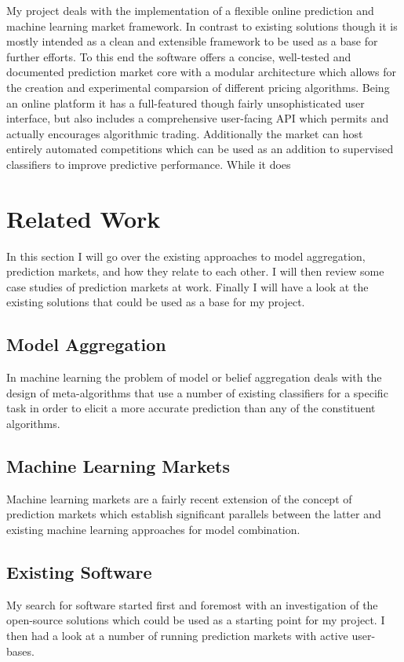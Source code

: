 \documentclass[bsc,frontabs,twoside,singlespacing,parskip,deptreport]{infthesis}     %
\begin{document}
	My project deals with the implementation of a flexible online prediction and machine learning market framework. In contrast to existing solutions  though it is mostly intended as a clean and extensible framework to be used as a base for further efforts. To this end the software offers a concise, well-tested and documented prediction market core with a modular architecture which allows for the creation and experimental comparsion of different pricing algorithms. Being an online platform it has a full-featured though fairly unsophisticated user interface, but also includes a comprehensive user-facing API which permits and actually encourages algorithmic trading. Additionally the market can host entirely automated competitions which can be used as an addition to supervised classifiers to improve predictive performance. 
	While it does 

\chapter{Related Work}

	In this section I will go over the existing approaches to model aggregation, prediction markets, and how they relate to each other. I will then review some case studies of prediction markets at work. Finally I will have a look at the existing solutions that could be used as a base for my project. 

\section{Model Aggregation}
	In machine learning the problem of model or belief aggregation deals with the design of meta-algorithms that use a number of existing classifiers for a specific task in order to elicit a more accurate prediction than any of the constituent algorithms. 

\section{Machine Learning Markets}
    Machine learning markets are a fairly recent extension of the concept of prediction markets which establish significant parallels between the latter and existing machine learning approaches for model combination.  

\section{Existing Software}
% 
	My search for software started first and foremost with an investigation of the open-source solutions which could be used as a starting point for my project. I then had a look at a number of running prediction markets with active user-bases.  
\end{document}
